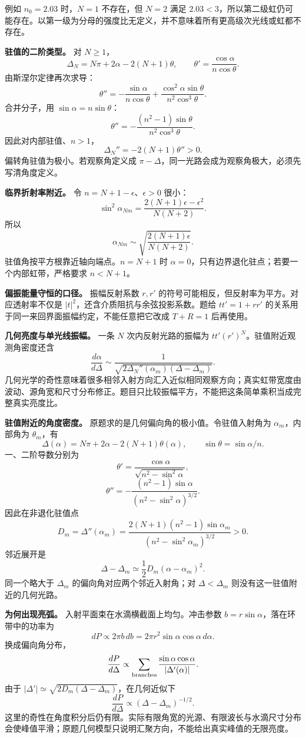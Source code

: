 \documentclass[12pt,a4paper,UTF8]{ctexart}
\begin{document}
例如 \(n_0=2.03\) 时，\(N=1\) 不存在，但 \(N=2\) 满足
\(2.03<3\)，所以第二级虹仍可能存在。以第一级为分母的强度比无定义，并不意味着所有更高级次光线或虹都不存在。

\textbf{驻值的二阶类型。} 对 \(N\ge1\)， \[
\Delta_N=N\pi+2\alpha-2(N+1)\theta,\qquad
\theta'=\frac{\cos\alpha}{n\cos\theta}.
\] 由斯涅尔定律再次求导： \[
\theta''=-\frac{\sin\alpha}{n\cos\theta}
+\frac{\cos^2\alpha\sin\theta}{n^2\cos^3\theta}.
\] 合并分子，用 \(\sin\alpha=n\sin\theta\)： \[
\theta''=-\frac{(n^2-1)\sin\theta}{n^2\cos^3\theta}.
\] 因此对内部驻值、\(n>1\)， \[
\Delta_N''=-2(N+1)\theta''>0.
\] 偏转角驻值为极小。若观察角定义成
\(\pi-\Delta\)，同一光路会成为观察角极大，必须先写清角度定义。

\textbf{临界折射率附近。} 令 \(n=N+1-\epsilon\)、\(\epsilon>0\) 很小：
\[
\sin^2\alpha_{Nm}
=\frac{2(N+1)\epsilon-\epsilon^2}{N(N+2)}.
\] 所以 \[
\alpha_{Nm}\sim
\sqrt{\frac{2(N+1)\epsilon}{N(N+2)}}.
\] 驻值角按平方根靠近轴向端点。\(n=N+1\) 时
\(\alpha=0\)，只有边界退化驻点；若要一个内部虹带，严格要求 \(n<N+1\)。

\textbf{偏振能量守恒的口径。} 振幅反射系数 \(r,r'\)
的符号可能相反，但反射率为平方。对应透射率不仅是
\(|t|^2\)，还含介质阻抗与余弦投影系数。题给 \(tt'=1+rr'\)
的关系用于同一来回界面振幅约定，不能任意把它改成 \(T+R=1\) 后再使用。

\textbf{几何亮度与单光线振幅。} 一条 \(N\) 次内反射光路的振幅为
\(tt'(r')^N\)。驻值附近观测角密度还含 \[
\frac{d\alpha}{d\Delta}\sim
\frac1{\sqrt{2\Delta_N''(\alpha_m)(\Delta-\Delta_m)}}.
\]
几何光学的奇性意味着很多相邻入射方向汇入近似相同观察方向；真实虹带宽度由波动、源角宽和尺寸分布修正。题目只比较振幅平方，不能把这条简单乘积当成完整真实亮度比。

\textbf{驻值附近的角度密度。}
原题求的是几何偏向角的极小值。令驻值入射角为 \(\alpha_m\)，内部角为
\(\theta_m\)，有 \[
\Delta(\alpha)=N\pi+2\alpha-2(N+1)\theta(\alpha),
\qquad \sin\theta=\sin\alpha/n.
\] 一、二阶导数分别为 \[
\theta'=\frac{\cos\alpha}{\sqrt{n^2-\sin^2\alpha}},
\] \[
\theta''=-\frac{(n^2-1)\sin\alpha}
{(n^2-\sin^2\alpha)^{3/2}}.
\] 因此在非退化驻值点 \[
D_m=\Delta''(\alpha_m)
=\frac{2(N+1)(n^2-1)\sin\alpha_m}
{(n^2-\sin^2\alpha_m)^{3/2}}>0.
\] 邻近展开是 \[
\Delta-\Delta_m\simeq\frac12D_m(\alpha-\alpha_m)^2.
\] 同一个略大于 \(\Delta_m\) 的偏向角对应两个邻近入射角；对
\(\Delta<\Delta_m\) 则没有这一驻值附近的几何光路。

\textbf{为何出现亮弧。} 入射平面束在水滴横截面上均匀。冲击参数
\(b=r\sin\alpha\)，落在环带中的功率为 \[
dP\propto 2\pi b\,db
=2\pi r^2\sin\alpha\cos\alpha\,d\alpha.
\] 换成偏向角分布， \[
\frac{dP}{d\Delta}\propto
\sum_{\rm branches}
\frac{\sin\alpha\cos\alpha}{|\Delta'(\alpha)|}.
\] 由于 \(|\Delta'|\simeq
\sqrt{2D_m(\Delta-\Delta_m)}\)，在几何近似下 \[
\frac{dP}{d\Delta}\propto(\Delta-\Delta_m)^{-1/2}.
\]
这里的奇性在角度积分后仍有限。实际有限角宽的光源、有限波长与水滴尺寸分布会使峰值平滑；原题几何模型只说明汇聚方向，不能给出真实峰值的无限亮度。
\end{document}
